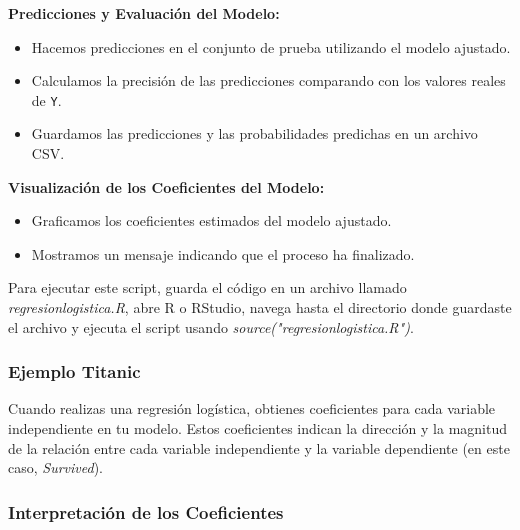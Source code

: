 \textbf{Predicciones y Evaluación del Modelo:}

\begin{itemize}
    \item Hacemos predicciones en el conjunto de prueba utilizando el modelo ajustado.
    \item Calculamos la precisión de las predicciones comparando con los valores reales de \texttt{Y}.
    \item Guardamos las predicciones y las probabilidades predichas en un archivo CSV.
\end{itemize}

\textbf{Visualización de los Coeficientes del Modelo:}

\begin{itemize}
    \item Graficamos los coeficientes estimados del modelo ajustado.
    \item Mostramos un mensaje indicando que el proceso ha finalizado.
\end{itemize}

Para ejecutar este script, guarda el código en un archivo llamado \textit{regresionlogistica.R}, abre R o RStudio, navega hasta el directorio donde guardaste el archivo y ejecuta el script usando \textit{source("regresionlogistica.R")}.

\subsubsection{Ejemplo Titanic}

Cuando realizas una regresión logística, obtienes coeficientes para cada variable independiente en tu modelo. Estos coeficientes indican la dirección y la magnitud de la relación entre cada variable independiente y la variable dependiente (en este caso, \textit{Survived}).

\subsubsection*{Interpretación de los Coeficientes}

